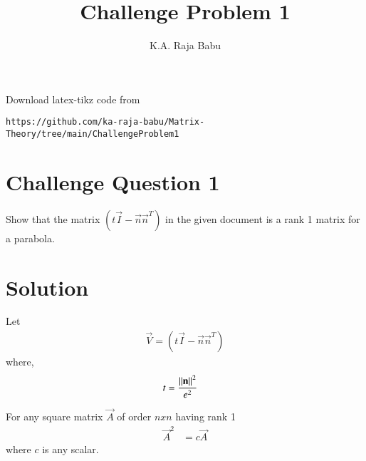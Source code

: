 \documentclass[journal,12pt,twocolumn]{IEEEtran}
\begin{document}
     \def\rightbox#1{\makebox[0in][r]{#1}}
     \def\centbox#1{\makebox[0in]{#1}}
     \def\topbox#1{\raisebox{-\baselineskip}[0in][0in]{#1}}
     \def\midbox#1{\raisebox{-0.5\baselineskip}[0in][0in]{#1}}
\vspace{3cm}
\title{Challenge Problem 1}
\author{K.A. Raja Babu}
\maketitle
\newpage
\bigskip
\renewcommand{\thefigure}{\theenumi}
\renewcommand{\thetable}{\theenumi}
Download latex-tikz code from 
%
\begin{lstlisting}
https://github.com/ka-raja-babu/Matrix-Theory/tree/main/ChallengeProblem1
\end{lstlisting}
%
\section{Challenge Question 1}
Show that the matrix $(t\vec{I}-\vec{n}\vec{n}^T)$ in the given document is a rank 1 matrix for a parabola.
%
\section{Solution}
Let
\begin{align}
    \vec{V} = (t\vec{I}-\vec{n}\vec{n}^T) 
\end{align}
where,
\begin{align}
    t &= \frac{\left\lVert\mathbf{n}\right\rVert^2}{e^2}
\end{align}

\begin{theorem}
\label{theorem1}
For any square matrix $\vec{A}$ of order $nxn$ having rank 1
\begin{align}
    \vec{A}^2 &= c\vec{A}
\end{align}
where $c$ is any scalar.
\end{theorem}
\end{document}
